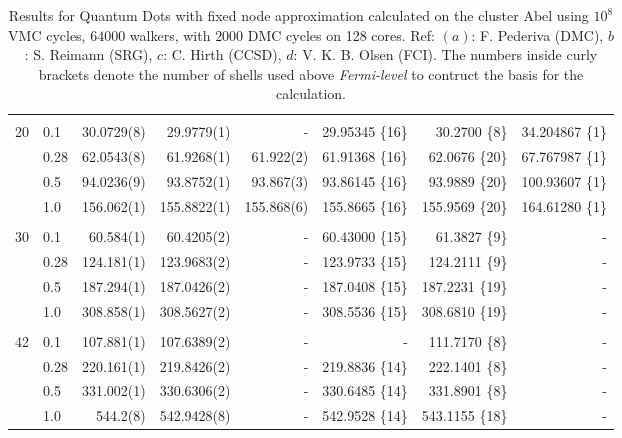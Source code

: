 \begin{table}
\begin{center}
\begin{tabular}{rl|rrrrrr}
\cline{2-8}
\multicolumn{8}{c}{} \\
    20    &   0.1    &  30.0729(8)  &  29.9779(1) & -		&29.95345 \{16\}	& 30.2700 \{8\} & 34.204867 \{1\}\\
          &   0.28   &  62.0543(8)  &  61.9268(1) & 61.922(2) &61.91368 \{16\}	& 62.0676 \{20\} & 67.767987 \{1\}\\
          &   0.5    &  94.0236(9)  &  93.8752(1) & 93.867(3) &93.86145 \{16\}	& 93.9889 \{20\} & 100.93607 \{1\}\\
          &   1.0    & 156.062(1)   & 155.8822(1) & 155.868(6)&155.8665 \{16\}	& 155.9569 \{20\}& 164.61280 \{1\}\\
\cline{2-8}
\multicolumn{8}{c}{} \\
    30    &   0.1    &  60.584(1)  &  60.4205(2)  & -		&60.43000 \{15\}	&  61.3827 \{9\}& -\\
          &   0.28   & 124.181(1)  & 123.9683(2)  & - 		&123.9733 \{15\}	& 124.2111 \{9\}& -\\
          &   0.5    & 187.294(1)  & 187.0426(2)  & - 		&187.0408 \{15\}	& 187.2231 \{19\}& -\\
          &   1.0    & 308.858(1)  & 308.5627(2)  & -	 	&308.5536 \{15\}	& 308.6810 \{19\}& -\\
\cline{2-8}
\multicolumn{8}{c}{} \\
    42    &   0.1    & 107.881(1)  & 107.6389(2)  & - 		&- 			& 111.7170 \{8\}& -\\
          &   0.28   & 220.161(1)  & 219.8426(2)  & - 		&219.8836 \{14\}	& 222.1401 \{8\}& -\\
          &   0.5    & 331.002(1)  & 330.6306(2)  & - 		&330.6485 \{14\}	& 331.8901 \{8\}& -\\
          &   1.0    & 544.2(8)    & 542.9428(8)  & - 		&542.9528 \{14\}	& 543.1155 \{18\}& -\\
\hline\hline


\end{tabular}
\caption{Results for Quantum Dots with fixed node approximation calculated on the cluster Abel using $10^8$ VMC cycles, $64000$ walkers, with $2000$ DMC cycles on 128 cores. Ref: $(a)$: F. Pederiva \cite{MagnusArticle} (DMC), $b$: S. Reimann \cite{Sarah} (SRG), $c$: C. Hirth \cite{Hirth} (CCSD), $d$: V. K. B. Olsen \cite{Olsen} (FCI). The numbers inside curly brackets denote the number of shells used above \textit{Fermi-level} to contruct the basis for the calculation.}
\label{tab:QDotsResultsAll}
\end{center}
\end{table}
\setlength{\tabcolsep}{6pt}

